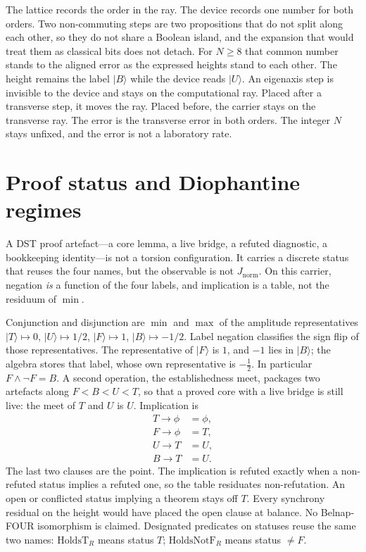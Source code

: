 \documentclass[a4paper]{article}
\theoremstyle{definition}
\newcommand{\Jnorm}{J_{\mathrm{norm}}}
\begin{document}
The lattice records the order in the ray. The device records one number
for both orders. Two non-commuting steps are two propositions that do
not split along each other, so they do not share a Boolean island, and
the expansion that would treat them as classical bits does not detach.
For \(N\ge 8\) that common number stands to the aligned error as the
expressed heights stand to each other. The height remains the label
\(\lvert B\rangle\) while the device reads \(\lvert U\rangle\). An
eigenaxis step is invisible to the device and stays on the computational
ray. Placed after a transverse step, it moves the ray. Placed before,
the carrier stays on the transverse ray. The error is the transverse
error in both orders. The integer \(N\) stays unfixed, and the error is
not a laboratory rate.

\section{Proof status and Diophantine regimes}
\label{sec:regime}

A DST proof artefact---a core lemma, a live bridge, a refuted
diagnostic, a bookkeeping identity---is not a torsion configuration.
It carries a discrete status that reuses the four names, but the
observable is not \(\Jnorm\). On this carrier, negation \emph{is} a
function of the four labels, and implication is a table, not the
residuum of \(\min\).

Conjunction and disjunction are \(\min\) and \(\max\) of the amplitude
representatives \(\lvert T\rangle\mapsto 0\), \(\lvert U\rangle\mapsto 1/2\),
\(\lvert F\rangle\mapsto 1\), \(\lvert B\rangle\mapsto -1/2\). Label
negation classifies the sign flip of those representatives. The
representative of \(\lvert F\rangle\) is \(1\), and \(-1\) lies in
\(\lvert B\rangle\); the algebra stores that label, whose own
representative is \(-\tfrac12\). In particular \(F\wedge\neg F=B\). A second operation, the establishedness
meet, packages two artefacts along \(F<B<U<T\), so that a proved core
with a live bridge is still live: the meet of \(T\) and \(U\) is \(U\).
Implication is
\[
\begin{aligned}
T\to\phi&=\phi,\\
F\to\phi&=T,\\
U\to T&=U,\\
B\to T&=U.
\end{aligned}
\]
The last two clauses are the point. The implication is refuted exactly
when a non-refuted status implies a refuted one, so the table
residuates non-refutation. An open or conflicted status implying a
theorem stays off \(T\). Every synchrony residual on the height would
have placed the open clause at balance. No Belnap-FOUR
isomorphism is claimed.
Designated predicates on statuses reuse the same two names:
\(\mathrm{HoldsT}_R\) means status \(T\);
\(\mathrm{HoldsNotF}_R\) means status \(\ne F\).
\end{document}
